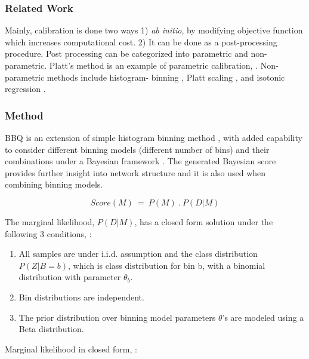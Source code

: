 \documentclass[11pt]{article}
\begin{document}
      \subsubsection{Related Work}
      \par Mainly, calibration is done two ways 1) \textit{ab initio}, by modifying
      objective function which increases computational cost. 2) It can be done as a
      post-processing procedure. Post processing can be categorized into parametric
      and non-parametric. Platt's method is an example of parametric calibration,
      \cite{platt1999probabilistic}. Non-parametric methods include histogram-
      binning \cite{zadrozny2001obtaining}, Platt scaling
      \cite{platt1999probabilistic}, and isotonic regression
      \cite{zadrozny2002transforming}.

      \subsubsection{Method}
      \par BBQ is an extension of simple histogram binning method
      \cite{zadrozny2001obtaining}, with added capability to consider different
      binning models (different number of bins) and their combinations under a
      Bayesian framework \cite{heckerman1995learning}. The generated Bayesian
      score provides further insight into network structure and it is also used
      when combining binning models.

      $$ \textit{Score}(M) ~=~ P(M)~.~P(D | M) $$

      The marginal likelihood, $P(D | M)$, has a closed form solution under the
      following 3 conditions, \cite{heckerman1995learning}:

      \begin{enumerate}
            \item All samples are under i.i.d. assumption and the class
            distribution $P(Z|B=b)$, which is class distribution for bin b,
            with a binomial distribution with parameter $\theta_b$.
            \item Bin distributions are independent.
            \item The prior distribution over binning model parameters $\theta$'s
            are modeled using a Beta distribution.
      \end{enumerate}

      Marginal likelihood in closed form, \cite{heckerman1995learning}:
\end{document}
